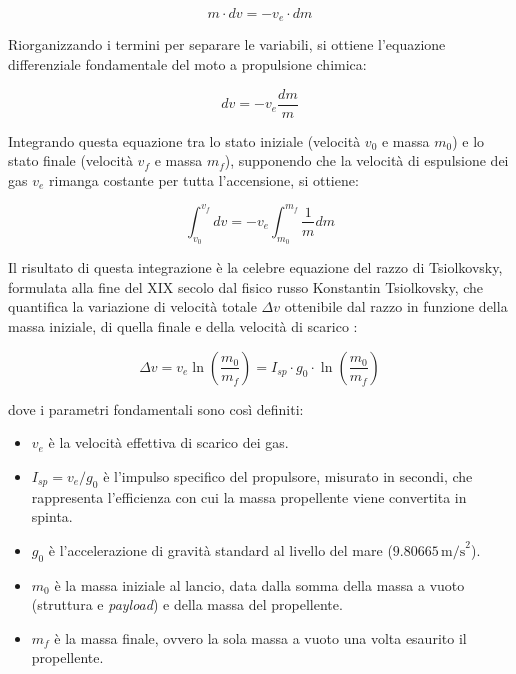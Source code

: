 \begin{equation}
    m \cdot dv = -v_e \cdot dm
\end{equation}

Riorganizzando i termini per separare le variabili, si ottiene l'equazione differenziale fondamentale del moto a propulsione chimica:

\begin{equation}
    dv = -v_e \frac{dm}{m}
\end{equation}

Integrando questa equazione tra lo stato iniziale (velocità $v_0$ e massa $m_0$) e lo stato finale (velocità $v_f$ e massa $m_f$), supponendo che la velocità di espulsione dei gas $v_e$ rimanga costante per tutta l'accensione, si ottiene:

\begin{equation}
    \int_{v_0}^{v_f} dv = -v_e \int_{m_0}^{m_f} \frac{1}{m} dm
\end{equation}

Il risultato di questa integrazione è la celebre equazione del razzo di Tsiolkovsky, formulata alla fine del XIX secolo dal fisico russo Konstantin Tsiolkovsky, che quantifica la variazione di velocità totale $\Delta v$ ottenibile dal razzo in funzione della massa iniziale, di quella finale e della velocità di scarico \cite{curtis2005orbital}:

\begin{equation} \label{eq:tsiolkovsky}
    \Delta v = v_e \ln\left(\frac{m_0}{m_f}\right) = I_{sp} \cdot g_0 \cdot \ln\left(\frac{m_0}{m_f}\right)
\end{equation}

dove i parametri fondamentali sono così definiti:
\begin{itemize}
    \item $v_e$ è la velocità effettiva di scarico dei gas.
    \item $I_{sp} = v_e / g_0$ è l'impulso specifico del propulsore, misurato in secondi, che rappresenta l'efficienza con cui la massa propellente viene convertita in spinta.
    \item $g_0$ è l'accelerazione di gravità standard al livello del mare ($9.80665 \, \text{m/s}^2$).
    \item $m_0$ è la massa iniziale al lancio, data dalla somma della massa a vuoto (struttura e \textit{payload}) e della massa del propellente.
    \item $m_f$ è la massa finale, ovvero la sola massa a vuoto una volta esaurito il propellente.
\end{itemize}

